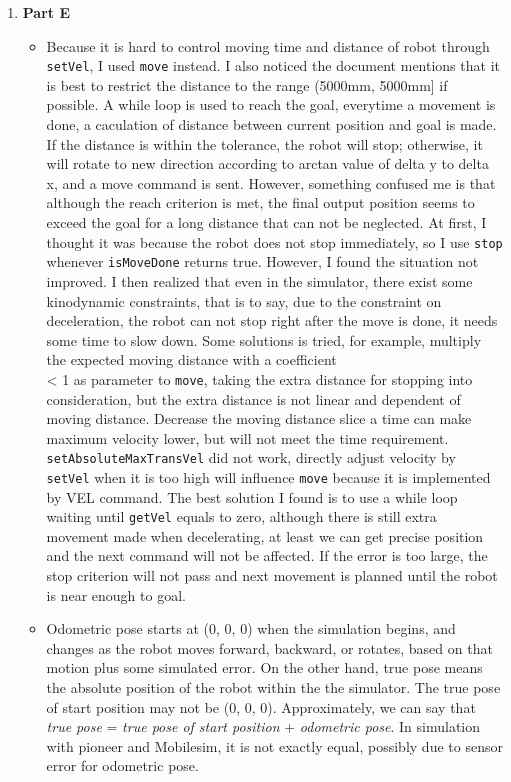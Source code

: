 \documentclass[12pt, a4paper]{article}
\begin{document}
\begin{enumerate}[1.]
\item
{\bf Part E} 
\begin{itemize}
\item
Because it is hard to control moving time and distance of robot through \texttt{setVel}, I used \texttt{move} instead. I also noticed the document mentions that it is best to restrict the distance to the range (5000mm, 5000mm] if possible. A while loop is used to reach the goal, everytime a movement is done, a caculation of distance between current position and goal is made. If the distance is within the tolerance, the robot will stop; otherwise, it will rotate to new direction according to arctan value of delta y to delta x, and a move command is sent. However, something confused me is that although the reach criterion is met, the final output position seems to exceed the goal for a long distance that can not be neglected. At first, I thought it was because the robot does not stop immediately, so I use \texttt{stop} whenever \texttt{isMoveDone} returns true. However, I found the situation not improved. I then realized that even in the simulator, there exist some kinodynamic constraints, that is to say, due to the constraint on deceleration, the robot can not stop right after the move is done, it needs some time to slow down. Some solutions is tried, for example, multiply the expected moving distance with a coefficient \\ < 1 as parameter to \texttt{move}, taking the extra distance for stopping into consideration, but the extra distance is not linear and dependent of moving distance. Decrease the moving distance slice a time can make maximum velocity lower, but will not meet the time requirement. \texttt{setAbsoluteMaxTransVel} did not work, directly adjust velocity by \texttt{setVel} when it is too high will influence \texttt{move} because it is implemented by VEL command. The best solution I found is to use a while loop waiting until \texttt{getVel} equals to zero, although there is still extra movement made when decelerating, at least we can get precise position and the next command will not be affected. If the error is too large, the stop criterion will not pass and next movement is planned until the robot is near enough to goal.
\item
Odometric pose starts at (0, 0, 0) when the simulation begins, and changes as the robot moves forward, backward, or rotates, based on that motion plus some simulated error. On the other hand, true pose means the absolute position of the robot within the the simulator. The true pose of start position may not be (0, 0, 0). Approximately, we can say that {\it true pose} = {\it true pose of start position} + {\it odometric pose}. In simulation with pioneer and Mobilesim, it is not exactly equal, possibly due to sensor error for odometric pose.

\end{itemize}
\end{enumerate}
\end{document}
